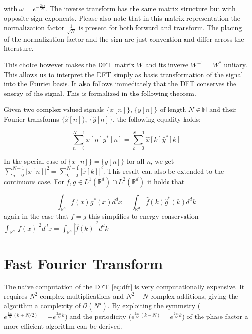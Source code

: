 with $\omega = e^{-\frac{2 \pi i}{N}}$. The inverse transform has the same matrix structure but with opposite-sign exponents. 
Please also note that in this matrix representation the normalization factor $\frac{1}{\sqrt{N}}$ is present for both forward and transform.
The placing of the normalization factor and the sign are just convention and differ across the literature.

This choice however makes the DFT matrix $W$ and its inverse $W^{-1}=W^{\ast}$ unitary. This allows us to interpret the DFT simply as basis transformation of the signal
into the Fourier basis. It also follows immediately that the DFT conserves the energy of the signal. This is formalized in the following theorem.

\begin{theorem}
    Given two complex valued signals $\{x[n]\}$, $\{y[n]\}$ of length $N \in \mathbb{N}$ and their Fourier transforms $\{\widehat{x}[n]\}$, $\{\widehat{y}[n]\}$, 
    the following equality holds:

    \begin{equation}
        \sum_{n=0}^{N-1} x[n] y^*[n] = \sum_{k=0}^{N-1} \widehat{x}[k] \widehat{y}^*[k]
    \end{equation}

    In the special case of $\{x[n]\} = \{y[n]\}$ for all $n$, we get $\sum_{n=0}^{N-1} | x[n] |^2 = \sum_{k=0}^{N-1} | \widehat{x}[k] |^2$.
    This result can also be extended to the continuous case. For $f, g \in L^1(\mathbb{R}^d) \cap L^2(\mathbb{R}^d)$ it holds that

    \begin{equation}
        \int_{\mathbb{R}^d} f(x) g^*(x) d^dx = \int_{\mathbb{R}^d} \widehat{f}(k) \widehat{g}^*(k) d^d k
    \end{equation}
    again in the case that $f=g$ this simplifies to energy conservation $\int_{\mathbb{R}^d} |f(x)|^2 d^dx = \int_{\mathbb{R}^d} |\widehat{f}(k)|^2 d^d k$
    \label{th:plancherel}
\end{theorem}

\section{Fast Fourier Transform}

The naive computation of the DFT \ref{eq:dft} is very computationally expensive. It requires $N^2$ complex multiplications and $N^2-N$ complex additions, 
giving the algorithm a complexity of $\mathcal{O}(N^2)$. By exploiting the symmetry ($e^{\frac{2 \pi i}{N}(k+N/2)} = - e^{\frac{2 \pi i}{N} k}$) and 
the periodicity ($e^{\frac{2 \pi i}{N}(k+N)} = e^{\frac{2 \pi i}{N} k}$) of the phase factor a more efficient algorithm can be derived.

